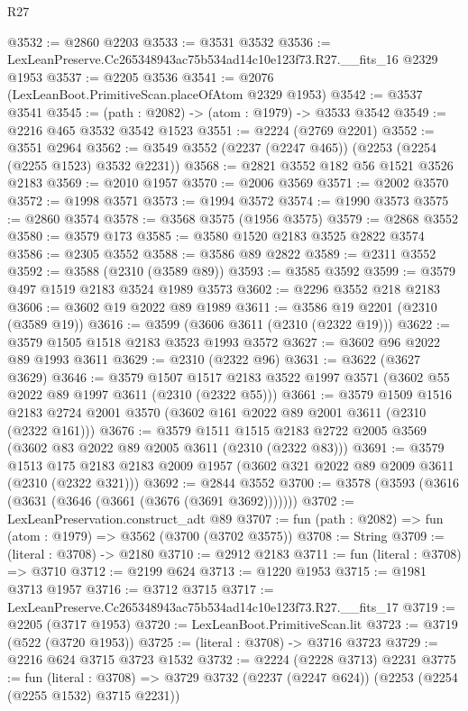 \begin{lexlean}{R27}
\begin{coremodule}
@3532 := @2860 @2203
@3533 := @3531 @3532
@3536 := LexLeanPreserve.Cc265348943ac75b534ad14c10e123f73.R27.__fits_16 @2329 @1953
@3537 := @2205 @3536
@3541 := @2076 (LexLeanBoot.PrimitiveScan.placeOfAtom @2329 @1953)
@3542 := @3537 @3541
@3545 := (path : @2082) -> (atom : @1979) -> @3533 @3542
@3549 := @2216 @465 @3532 @3542 @1523
@3551 := @2224 (@2769 @2201)
@3552 := @3551 @2964
@3562 := @3549 @3552 (@2237 (@2247 @465)) (@2253 (@2254 (@2255 @1523) @3532 @2231))
@3568 := @2821 @3552 @182 @56 @1521 @3526 @2183
@3569 := @2010 @1957
@3570 := @2006 @3569
@3571 := @2002 @3570
@3572 := @1998 @3571
@3573 := @1994 @3572
@3574 := @1990 @3573
@3575 := @2860 @3574
@3578 := @3568 @3575 (@1956 @3575)
@3579 := @2868 @3552
@3580 := @3579 @173
@3585 := @3580 @1520 @2183 @3525 @2822 @3574
@3586 := @2305 @3552
@3588 := @3586 @89 @2822
@3589 := @2311 @3552
@3592 := @3588 (@2310 (@3589 @89))
@3593 := @3585 @3592
@3599 := @3579 @497 @1519 @2183 @3524 @1989 @3573
@3602 := @2296 @3552 @218 @2183
@3606 := @3602 @19 @2022 @89 @1989
@3611 := @3586 @19 @2201 (@2310 (@3589 @19))
@3616 := @3599 (@3606 @3611 (@2310 (@2322 @19)))
@3622 := @3579 @1505 @1518 @2183 @3523 @1993 @3572
@3627 := @3602 @96 @2022 @89 @1993 @3611
@3629 := @2310 (@2322 @96)
@3631 := @3622 (@3627 @3629)
@3646 := @3579
    @1507
    @1517
    @2183
    @3522
    @1997
    @3571
    (@3602 @55 @2022 @89 @1997 @3611 (@2310 (@2322 @55)))
@3661 := @3579
    @1509
    @1516
    @2183
    @2724
    @2001
    @3570
    (@3602 @161 @2022 @89 @2001 @3611 (@2310 (@2322 @161)))
@3676 := @3579
    @1511
    @1515
    @2183
    @2722
    @2005
    @3569
    (@3602 @83 @2022 @89 @2005 @3611 (@2310 (@2322 @83)))
@3691 := @3579
    @1513
    @175
    @2183
    @2183
    @2009
    @1957
    (@3602 @321 @2022 @89 @2009 @3611 (@2310 (@2322 @321)))
@3692 := @2844 @3552
@3700 := @3578 (@3593 (@3616 (@3631 (@3646 (@3661 (@3676 (@3691 @3692)))))))
@3702 := LexLeanPreservation.construct_adt @89
@3707 := fun (path : @2082) => fun (atom : @1979) => @3562 (@3700 (@3702 @3575))
@3708 := String
@3709 := (literal : @3708) -> @2180
@3710 := @2912 @2183
@3711 := fun (literal : @3708) => @3710
@3712 := @2199 @624
@3713 := @1220 @1953
@3715 := @1981 @3713 @1957
@3716 := @3712 @3715
@3717 := LexLeanPreserve.Cc265348943ac75b534ad14c10e123f73.R27.__fits_17
@3719 := @2205 (@3717 @1953)
@3720 := LexLeanBoot.PrimitiveScan.lit
@3723 := @3719 (@522 (@3720 @1953))
@3725 := (literal : @3708) -> @3716 @3723
@3729 := @2216 @624 @3715 @3723 @1532
@3732 := @2224 (@2228 @3713) @2231
@3775 := fun (literal : @3708) =>
  @3729
    @3732
    (@2237 (@2247 @624))
    (@2253 (@2254 (@2255 @1532) @3715 @2231))

\end{coremodule}
\end{lexlean}
